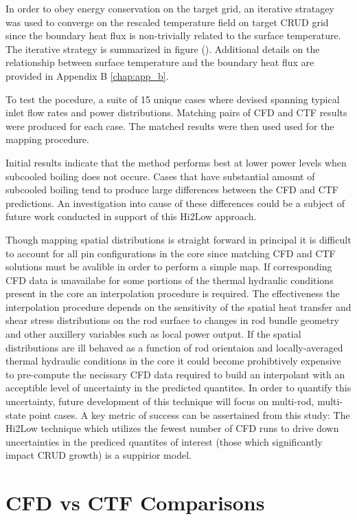 In order to obey energy conservation on the target grid,  an iterative stratagey was used to converge on the rescaled temperature field on target CRUD grid since the boundary heat flux is non-trivially related to the surface temperature.  The iterative strategy is summarized in figure (). 
Additional details on the relationship between surface temperature and the boundary heat flux are provided in Appendix B \ref{chap:app_b}.

To test the pocedure, a suite of 15 unique cases where devised spanning typical inlet flow rates and power distributions.  Matching pairs of CFD and CTF results were produced for each case.  The matched results were then used used for the mapping procedure.

Initial results indicate that the method performs best at lower power levels when subcooled boiling does not occure.  Cases that have substantial amount of subcooled boiling tend to produce large differences between the CFD and CTF predictions.  An investigation into cause of these differences could be a subject of future work conducted in support of this Hi2Low approach.  

Though mapping spatial distributions is straight forward in principal it is difficult to account for all pin configurations in the core since matching CFD and CTF solutions must be avalible in order to perform a simple map.  If corresponding CFD data is unavailabe for some portions of the thermal hydraulic conditions present in the core an interpolation procedure is required.  The effectiveness the interpolation procedure depends on the sensitivity of the spatial heat transfer and shear stress distributions on the rod surface to changes in rod bundle geometry and other auxillery variables such as local power output.  If the spatial distributions are ill behaved as a function of rod orientaion and locally-averaged thermal hydraulic conditions in the core it could become prohibtively expensive to pre-compute the necissary CFD data required to build an interpolant with an acceptible level of uncertainty in the predicted quantites.  In order to quantify this uncertainty, future development of this technique will focus on multi-rod, multi-state point cases.
A key metric of success can be assertained from this study:  The Hi2Low technique which utilizes the fewest number of CFD runs to drive down uncertainties in the prediced quantites of interest (those which significantly impact CRUD growth) is a suppirior model.

\section{CFD vs CTF Comparisons}

